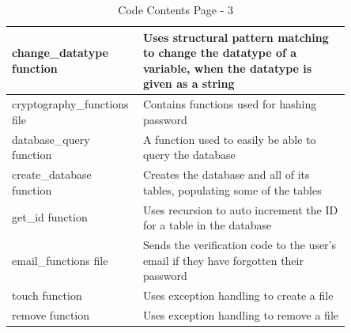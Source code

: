 \documentclass[12pt]{article}
\begin{document}
\begin{table}[ht]
\begin{tabular}{|p{0.26\linewidth}|p{0.59\linewidth}|}
    \hline
    change\_datatype \phantom{text} function & Uses structural pattern matching to change the datatype of a variable, when the datatype is given as a string \\
    \hline
    cryptography\_functions file & Contains functions used for hashing password\\
    \hline
    database\_query \phantom{text} function & A function used to easily be able to query the database \\
    \hline
    create\_database \phantom{text} function & Creates the database and all of its tables, populating some of the tables\\
    \hline
    get\_id function & Uses recursion to auto increment the ID for a table in the database\\
    \hline
    email\_functions file & Sends the verification code to the user's email if they have forgotten their password\\
    \hline
    touch function & Uses exception handling to create a file\\
    \hline
    remove function & Uses exception handling to remove a file\\
    \hline
    \end{tabular}
    \caption{Code Contents Page - 3}
\end{table}
\clearpage
\end{document}
